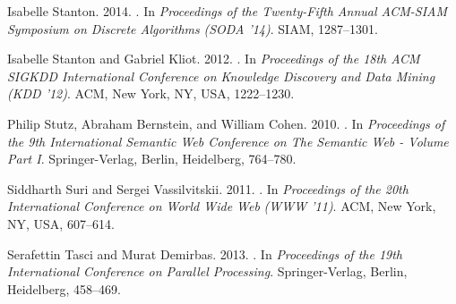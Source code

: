 \documentclass[reprint,twocolumn,showpacs,preprintnumbers,amsmath, aps,pre,amssymb]{revtex4-1}
\begin{document}
\begin{thebibliography}{00}
{
{Isabelle Stanton}. 2014.
\newblock {}. In {\em Proceedings of the Twenty-Fifth Annual ACM-SIAM
  Symposium on Discrete Algorithms} {\em (SODA '14)}. SIAM, 1287--1301.
\newblock
{}


{Isabelle Stanton} {and} {Gabriel Kliot}. 2012.
\newblock {}. In {\em Proceedings of the 18th ACM SIGKDD International Conference
  on Knowledge Discovery and Data Mining} {\em (KDD '12)}. ACM, New York, NY,
  USA, 1222--1230.
\newblock
{}


{Philip Stutz}, {Abraham Bernstein}, {and} {William Cohen}. 2010.
\newblock {}.
\newblock In {\em Proceedings of the 9th International Semantic Web Conference
  on The Semantic Web - Volume Part I}. Springer-Verlag, Berlin, Heidelberg,
  764--780.
\newblock
{}


{Siddharth Suri} {and} {Sergei Vassilvitskii}. 2011.
\newblock {}. In {\em Proceedings of the 20th International Conference on World
  Wide Web} {\em (WWW '11)}. ACM, New York, NY, USA, 607--614.
\newblock
{}


{Serafettin Tasci} {and} {Murat Demirbas}. 2013.
\newblock {}.
\newblock In {\em Proceedings of the 19th International Conference on Parallel
  Processing}. Springer-Verlag, Berlin, Heidelberg, 458--469.
\newblock
{}


}
\end{thebibliography}
\end{document}

